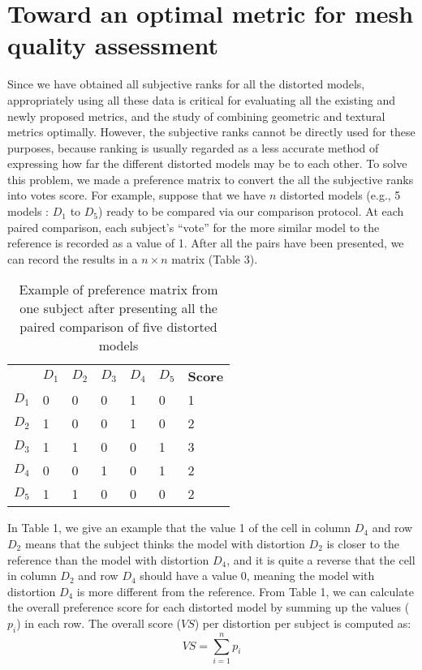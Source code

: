 \section{Toward an optimal metric for mesh quality assessment}
Since we have obtained all subjective ranks for all the distorted models, appropriately using all these data is critical for evaluating all the existing and newly proposed metrics, and the study of combining geometric and textural metrics optimally. However, the subjective ranks cannot be directly used for these purposes, because ranking is usually regarded as a less accurate method of expressing how far the different distorted models may be to each other.  To solve this problem, we made a preference matrix \cite{Ledda_2005} to convert the all the subjective ranks into votes score. For example, suppose that we have $n$ distorted models (e.g., 5 models : $D_1$ to $D_5$) ready to be compared via our comparison protocol.   At each paired comparison, each subject’s “vote” for the more similar model to the reference is recorded as a value of 1. After all the pairs have been presented, we can record the results in a $n \times n$ matrix (Table 3).
\begin{table}[]
\centering
\caption{Example of preference matrix from one subject after presenting all the paired comparison of five distorted models}
\label{my-label}
\begin{tabular}{lllllll}
            & $D_1$ & $D_2$ & $D_3$ & $D_4$ & $D_5$ & \textbf{Score} \\
$D_1$ & 0           & 0           & 0           & 1           & 0           & 1     \\
$D_2$ & 1           & 0           & 0           & 1           & 0           & 2     \\
$D_3$ & 1           & 1           & 0           & 0           & 1           & 3     \\
$D_4$ & 0           & 0           & 1           & 0           & 1           & 2     \\
$D_5$ & 1           & 1           & 0           & 0           & 0           & 2    
\end{tabular}
\end{table}
In Table 1, we give an example that the value 1 of the cell in column $D_4$ and row $D_2$ means that the subject thinks the model with distortion $D_2$ is closer to the reference than the model with distortion $D_4$, and it is quite a reverse that the cell in column $D_2$ and row $D_4$ should have a value 0, meaning the model with distortion $D_4$ is more different from the reference. From Table 1, we can calculate the overall preference score for each distorted model by summing up the values ($p_i$) in each row. The overall score ($VS$) per distortion per subject is computed as:
\begin{equation}
VS =\sum_{i=1}^n{p_i}
\end{equation}